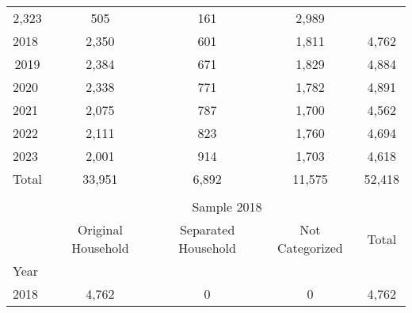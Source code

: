 \documentclass{article}
\begin{document}
\begin{table}[!h]
\begin{tabular}{lllll}
  \multicolumn{1}{|c}{2,323} &
  \multicolumn{1}{c}{505} &
  \multicolumn{1}{c}{161} &
  \multicolumn{1}{c}{2,989} \\
\multicolumn{1}{l}{\hspace{1em}2018} &
  \multicolumn{1}{|c}{2,350} &
  \multicolumn{1}{c}{601} &
  \multicolumn{1}{c}{1,811} &
  \multicolumn{1}{c}{4,762} \\
\multicolumn{1}{c}{\hspace{1em}2019} &
  \multicolumn{1}{|c}{2,384} &
  \multicolumn{1}{c}{671} &
  \multicolumn{1}{c}{1,829} &
  \multicolumn{1}{c}{4,884} \\
\multicolumn{1}{l}{\hspace{1em}2020} &
  \multicolumn{1}{|c}{2,338} &
  \multicolumn{1}{c}{771} &
  \multicolumn{1}{c}{1,782} &
  \multicolumn{1}{c}{4,891} \\
\multicolumn{1}{l}{\hspace{1em}2021} &
  \multicolumn{1}{|c}{2,075} &
  \multicolumn{1}{c}{787} &
  \multicolumn{1}{c}{1,700} &
  \multicolumn{1}{c}{4,562} \\
\multicolumn{1}{l}{\hspace{1em}2022} &
  \multicolumn{1}{|c}{2,111} &
  \multicolumn{1}{c}{823} &
  \multicolumn{1}{c}{1,760} &
  \multicolumn{1}{c}{4,694} \\
\multicolumn{1}{l}{\hspace{1em}2023} &
  \multicolumn{1}{|c}{2,001} &
  \multicolumn{1}{c}{914} &
  \multicolumn{1}{c}{1,703} &
  \multicolumn{1}{c}{4,618} \\
\cline{1-5} 
\multicolumn{1}{l}{\hspace{1em}Total} &
  \multicolumn{1}{|c}{33,951} &
  \multicolumn{1}{c}{6,892} &
  \multicolumn{1}{c}{11,575} &
  \multicolumn{1}{c}{52,418} \\
\cline{1-5} \\
\multicolumn{1}{c}{} &
  \multicolumn{4}{|c}{Sample 2018} \\
\multicolumn{1}{c}{} &
  \multicolumn{1}{|c}{Original Household} &
  \multicolumn{1}{c}{Separated Household} &
  \multicolumn{1}{c}{Not Categorized} &
  \multicolumn{1}{c}{Total} \\
\cline{1-5} 
\multicolumn{1}{l}{Year} &
  \multicolumn{1}{|c}{} &
  \multicolumn{1}{c}{} &
  \multicolumn{1}{c}{} &
  \multicolumn{1}{c}{} \\
\multicolumn{1}{l}{\hspace{1em}2018} &
  \multicolumn{1}{|c}{4,762} &
  \multicolumn{1}{c}{0} &
  \multicolumn{1}{c}{0} &
  \multicolumn{1}{c}{4,762} \\

\end{tabular}
\end{table}
\end{document}
